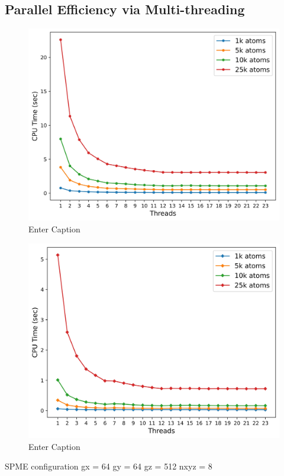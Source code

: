 \subsection{Parallel Efficiency via Multi-threading}
\begin{figure}[H]
    \centering
    \includegraphics[width=0.7\linewidth]{images/threadstimetotal.jpg}
    \caption{Enter Caption}
    \label{fig:enter-label}
\end{figure}
\begin{figure}[H]
    \centering
    \includegraphics[width=0.7\linewidth]{images/threadstimeSPMEtotal.jpg}
    \caption{Enter Caption}
    \label{fig:enter-label}
\end{figure}
SPME configuration
gx = 64 
gy = 64
gz = 512
nxyz = 8

